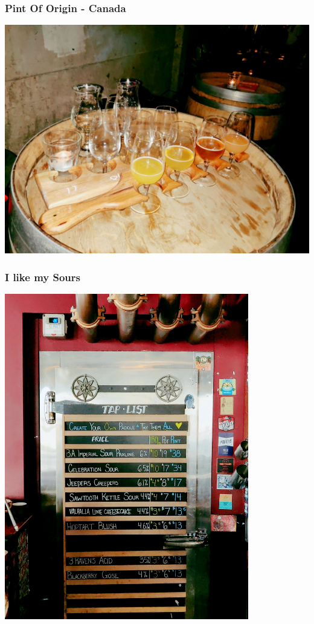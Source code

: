 \documentclass[12pt]{beamer}
\begin{document}
    \begin{frame}
        \frametitle{Pint Of Origin - Canada}
        \includegraphics[height=0.80\textheight,width=1\textwidth]{img/canada-poo.jpg}
    \end{frame}

    \begin{frame}
        \frametitle{I like my Sours}
        \includegraphics[height=0.80\textheight,width=0.8\textwidth]{img/sour-only.jpg}
    \end{frame}
\end{document}
